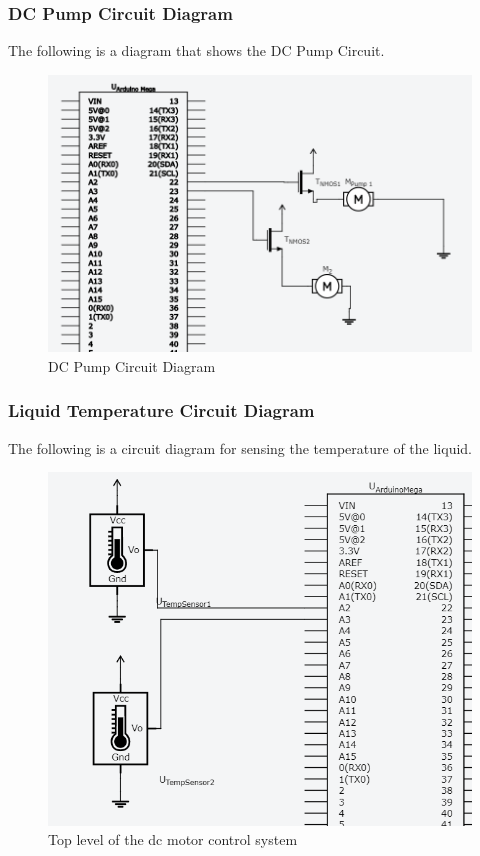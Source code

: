 \documentclass [10pt]{article}
\begin{document}

\subsubsection{DC Pump Circuit Diagram}
The following is a diagram that shows the DC Pump Circuit.
\begin{figure} [h!]
	\centering
	\includegraphics [scale = 0.6] {Figures/Pump.png}
	\caption{DC Pump Circuit Diagram}
\end{figure}


\subsubsection{Liquid Temperature Circuit Diagram}
The following is a circuit diagram for sensing the temperature of the liquid.
\begin{figure} [h!]
	\centering
	\includegraphics [scale = 0.6] {Figures/TempSensor.png}
	\caption{Top level of the dc motor control system}
\end{figure}
\end{document}
